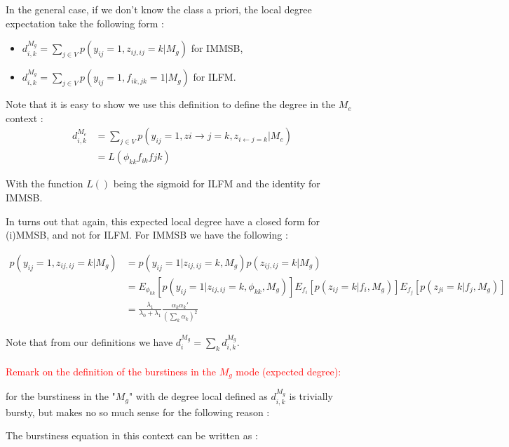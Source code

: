 In the general case, if we don't know the class a priori, the local degree expectation take the following form :

\begin{itemize}
\item  $d_{i,k}^{M_g} = \sum_{j\in V} p(y_{ij}=1, z_{ij, ij}=k | M_g)$ for IMMSB,
\item  $d_{i,k}^{M_g} = \sum_{j\in V} p(y_{ij}=1, f_{ik, jk}=1| M_g)$ for ILFM.
\end{itemize}

Note that it is easy to show we use this definition to define the degree in the $M_e$ context :
\begin{align*}
 d_{i,k}^{M_e} &= \sum_{j\in V} p(y_{ij}=1, z{i\rightarrow j}=k, z_{i\leftarrow j =k} | M_e) \\
  &= L(\phi_{kk} f_{ik} f{jk})
 \end{align*}
 
With the function $L()$ being the sigmoid for ILFM and the identity for IMMSB.

In turns out that again, this expected local degree have a closed form for (i)MMSB, and not for ILFM. For IMMSB we have the following :

\begin{align*}
p(y_{ij}=1, z_{ij, ij}=k | M_g) &= p(y_{ij}=1 |  z_{ij, ij}=k, M_g) p( z_{ij, ij}=k | M_g) \\
 &=E_{\phi_{kk}}[ p(y_{ij}=1 |  z_{ij, ij}=k, \phi_{kk}, M_g) ] E_{f_i}[ p( z_{ij}=k | f_i, M_g)] E_{f_j}[ p( z_{ji}=k | f_j, M_g)] \\
 &= \frac{\lambda_1}{\lambda_0+\lambda_1}\frac{ \alpha_k\alpha_k'}{ (\sum_k \alpha_k)^2}
\end{align*}

Note that from our definitions we have $d_i^{M_g} = \sum_k d_{i,k}^{M_g}$.


\paragraph{}
\textcolor{red}{Remark on the definition of the burstiness in the $M_g$ mode (expected degree):
\hrulefill
\hrulefill
~\\
}

for the burstiness in the "$M_g$" with de degree local defined as $d_{i,k}^{M_g}$  is trivially bursty, but makes no so much sense for the following reason :

The burstiness equation in this context can be written as :


